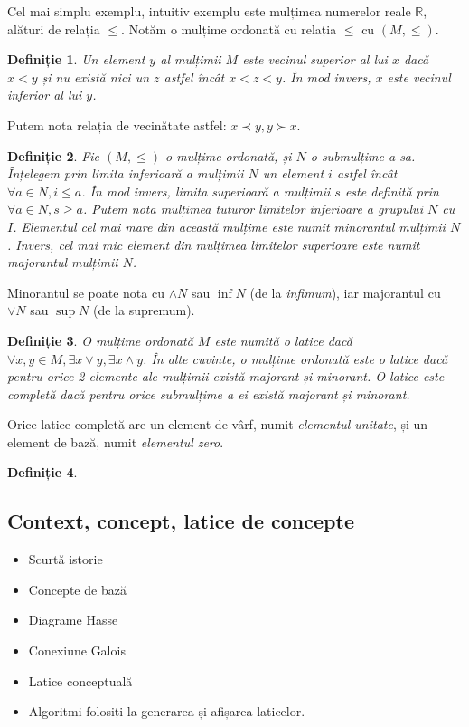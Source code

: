 \documentclass[12pt, a4paper, twoside, romanian]{teza-upb}
\newtheorem{defn}{Definiție}
\begin{document}
    Cel mai simplu exemplu, intuitiv exemplu este mulțimea numerelor reale $ \mathbb{R}$, alături de relația $\le$. Notăm o mulțime ordonată cu relația $\le$ cu $(M, \le)$.

    \begin{defn}
      Un element $y$ al mulțimii $M$ este \emph{vecinul superior} al lui $x$ dacă $x < y$ și nu există nici un $z$ astfel încât $x < z < y$. În mod invers, $x$ este \emph{vecinul inferior} al lui $y$.
    \end{defn}

    Putem nota relația de vecinătate astfel: $x \prec y, y \succ x$.

    \begin{defn}
      Fie $(M, \le)$ o mulțime ordonată, și $N$ o submulțime a sa. Înțelegem prin \emph{limita inferioară} a mulțimii $N$ un element $i$ astfel încât $\forall a \in N, i \le a$. În mod invers, \emph{limita superioară} a mulțimii $s$ este definită prin $\forall a \in N, s \ge a$.
      Putem nota mulțimea tuturor limitelor inferioare a grupului $N$ cu $I$. Elementul cel mai mare din această mulțime este numit \emph{minorantul} mulțimii $N$. Invers, cel mai mic element din mulțimea limitelor superioare este numit \emph{majorantul} mulțimii $N$.
    \end{defn}

    Minorantul se poate nota cu $\wedge N$ sau $\inf N$ (de la \emph{infimum}), iar majorantul cu $\vee N$ sau $\sup N$ (de la supremum).

    \begin{defn}
      O mulțime ordonată $M$ este numită o \emph{latice} dacă $\forall x,y \in M, \exists x \vee y, \exists x \wedge y$. În alte cuvinte, o mulțime ordonată este o latice dacă pentru orice 2 elemente
      ale mulțimii există majorant și minorant. O latice este \emph{completă} dacă pentru orice submulțime a ei există majorant și minorant.
    \end{defn}

    Orice latice completă are un element de vârf, numit \emph{elementul unitate}, și un element de bază, numit \emph{elementul zero}.

    \begin{defn}
    \end{defn}
    \subsection{Context, concept, latice de concepte}
    \begin{itemize}
      \item Scurtă istorie
      \item Concepte de bază
      \item Diagrame Hasse
      \item Conexiune Galois
      \item Latice conceptuală
      \item Algoritmi folosiți la generarea și afișarea laticelor.
    \end{itemize}
\end{document}
